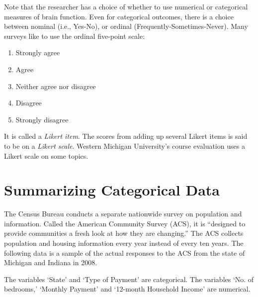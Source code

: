 \documentclass[11pt, chapterprefix=true]{scrbook}\usepackage[]{graphicx}\usepackage[]{color}
\begin{document}
Note that the researcher has a choice of whether to use numerical or categorical measures of brain function.  Even for categorical outcomes, there is a choice between nominal (i.e., Yes-No), or ordinal (Frequently-Sometimes-Never). Many surveys like to use the ordinal five-point scale:

{\small{
\begin{enumerate}
\item Strongly agree
\item Agree
\item Neither agree nor disagree
\item Disagree
\item Strongly disagree
\end{enumerate}
}}

It is called a \textit{Likert item}.  The scores from adding up several Likert items is said to be on a \textit{Likert scale}.  Western Michigan University's course evaluation uses a Likert scale on some topics.

\section{Summarizing Categorical Data}

The Census Bureau conducts a separate nationwide survey on population and information.  Called the American Community Survey (ACS), it is ``designed to provide communities a fresh look at how they are changing.'' The ACS collects population and housing information every year instead of every ten years.  The following data is a sample of the actual responses to the ACS from the state of Michigan and Indiana in 2008.

The variables `State' and `Type of Payment' are categorical.  The variables `No. of bedrooms,' `Monthly Payment' and `12-month Household Income' are numerical.
\end{document}
